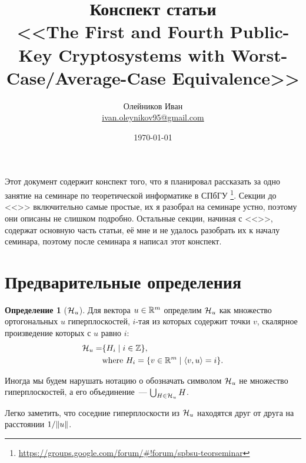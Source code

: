 \documentclass[oneside, a4paper]{article}
\theoremstyle{plain}
\theoremstyle{definition}
\newtheorem{defn}{Определение}
\theoremstyle{remark}
\newenvironment{definition}[1]{%
\begin{tcolorbox}[breakable,enhanced]
\begin{defn}[#1]
}{%
\end{defn}
\end{tcolorbox}
}
\newcommand\R{\ensuremath \mathbb R}
\newcommand\Z{\ensuremath \mathbb Z}
\newcommand\HH{\ensuremath \operatorname{\mathcal H}}
\DeclarePairedDelimiter\norm{\lVert}{\rVert}
\DeclarePairedDelimiter\ang{\langle}{\rangle}
\begin{document}
\title{Конспект статьи \\ \foreignlanguage{english}{<<The First and Fourth Public-Key Cryptosystems
with Worst-Case/Average-Case Equivalence>>  \cite{ajtaidwork}}}
\author{Олейников Иван \\ \url{ivan.oleynikov95@gmail.com}}
\date{\today}
\maketitle

Этот документ содержит конспект того, что я планировал рассказать за одно занятие на семинаре по теоретической
информатике в СПбГУ \footnote{\url{https://groups.google.com/forum/\#!forum/spbsu-teorseminar}}. Секции до
<<>> включительно самые простые, их я разобрал на семинаре устно, поэтому они описаны не слишком
подробно. Остальные секции, начиная с <<>>, содержат основную часть статьи, её мне и не
удалось разобрать их к началу семинара, поэтому после семинара я написал этот конспект.

\tableofcontents

\section{Предварительные определения}

\begin{definition}{$\HH_u$}
Для вектора $u \in \R^m$ определим $\HH_u$ как множество ортогональных $u$ гиперплоскостей, $i$-тая из которых содержит
точки $v$, скалярное произведение которых с $u$ равно $i$:
\[
\begin{aligned}
\HH_u = &\{H_i \mid i \in \Z \}, \\
&\text{where } H_i = \{v \in \R^m \mid \ang{v, u} = i\}.
\end{aligned}
\]

Иногда мы будем нарушать нотацию о обозначать символом $\HH_u$ не множество гиперплоскостей, а его объединение~---
$\bigcup_{H \in \HH_u} H$.
\end{definition}

Легко заметить, что соседние гиперплоскости из $\HH_u$ находятся друг от друга на расстоянии $1/\norm{u}$.
\end{document}
